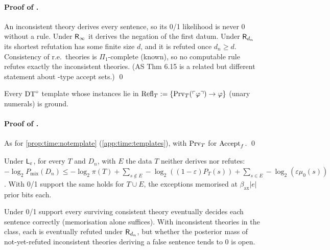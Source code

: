 \paragraph{Proof of .} An inconsistent theory derives every sentence, so its 0/1 likelihood is never $0$ without a rule. Under $\mathsf{R}_{\infty}$ it derives the negation of the first datum. Under $\mathsf{R}_{d_n}$ its shortest refutation has some finite size $d$, and it is refuted once $d_n\ge d$. Consistency of r.e.\ theories is $\Pi_1$-complete (known), so no computable rule refutes exactly the inconsistent theories. (AS Thm 6.15 is a related but different statement about \DTRC-type accept sets.) \qed

\begin{proposition}\pabrk{}\label{prop:pa:refl}
Every $\mathrm{DT}^{\circ}$ template whose instances lie in $\mathrm{Refl}_T:=\{\mathrm{Prv}_T(\ulcorner \varphi\urcorner)\to\varphi\}$ (unary numerals) is ground.
\end{proposition}

\paragraph{Proof of .} As for \cref{prop:time:notemplate} (\cref{app:time:templates}), with $\mathrm{Prv}_T$ for $\mathrm{Accept}_{f}$. \qed

\begin{proposition}\pabrk{}\label{prop:pa:regret}
Under $\mathsf{L}_{\varepsilon}$, for every $T$ and $D_n$, with $E$ the data $T$ neither derives nor refutes: $-\log_2P_{\mathrm{mix}}(D_n)\le-\log_2\pi(T)+\sum_{s\notin E}-\log_2((1-\varepsilon)P_T(s))+\sum_{s\in E}-\log_2(\varepsilon\mu_0(s))$. With 0/1 support the same holds for $T\cup E$, the exceptions memorised at $\beta_{\mathrm{ax}}|e|$ prior bits each.
\end{proposition}

\begin{remark}\pabrk{}\label{rem:pa:pointwise}
Under 0/1 support every surviving consistent theory eventually decides each sentence correctly (memorisation alone suffices). With inconsistent theories in the class, each is eventually refuted under $\mathsf{R}_{d_n}$, but whether the posterior mass of not-yet-refuted inconsistent theories deriving a false sentence tends to $0$ is open.
\end{remark}


